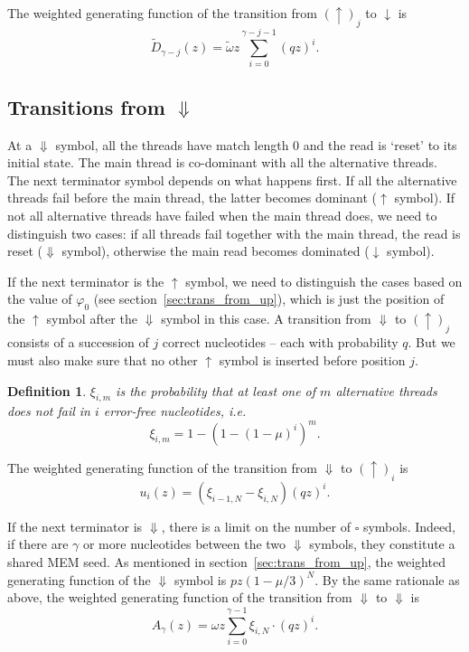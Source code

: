 \documentclass{article}
\newtheorem{definition}{Definition}
\begin{document}
The weighted generating function of the transition from
$(\uparrow)_j$ to $\downarrow$ is
\begin{equation}
\tilde{D}_{\gamma-j}(z) = \tilde{\omega} z
  \sum_{i=0}^{\gamma-j-1} (qz)^i.
\end{equation}


\subsection{Transitions from $\Downarrow$}
\label{sec:trans_from_Down}

At a $\Downarrow$ symbol, all the threads have match length $0$ and the
read is `reset' to its initial state. The main thread is co-dominant with
all the alternative threads. The next terminator symbol depends on what
happens first. If all the alternative threads fail before the main thread,
the latter becomes dominant ($\uparrow$ symbol). If not all alternative
threads have failed when the main thread does, we need to distinguish two
cases: if all threads fail together with the main thread, the read is
reset ($\Downarrow$ symbol), otherwise the main read becomes dominated
($\downarrow$ symbol).

If the next terminator is the $\uparrow$ symbol, we need to distinguish
the cases based on the value of $\varphi_0$ (see
section~\ref{sec:trans_from_up}), which is just the position of the
$\uparrow$ symbol after the $\Downarrow$ symbol in this case. A transition
from $\Downarrow$ to $(\uparrow)_j$ consists of a succession of $j$
correct nucleotides -- each with probability $q$. But we must also make
sure that no other $\uparrow$ symbol is inserted before position $j$.

\begin{definition}
$\xi_{i,m}$ is the probability that at least one of $m$ alternative
threads does not fail in $i$ error-free nucleotides, \textit{i.e.}
\begin{equation}
  \xi_{i,m} = 1-(1-(1-\mu)^i)^m.
\end{equation}
\end{definition}

The weighted generating function of the transition from $\Downarrow$ to
$(\uparrow)_i$ is
\begin{equation}
u_i(z) = (\xi_{i-1,N}-\xi_{i,N})(qz)^i.
\end{equation}


If the next terminator is $\Downarrow$, there is a limit on the
number of $\square$ symbols. Indeed, if there are $\gamma$ or more
nucleotides between the two $\Downarrow$ symbols, they constitute a shared
MEM seed. As mentioned in section~\ref{sec:trans_from_up}, the weighted
generating function of the $\Downarrow$ symbol is $pz(1-\mu/3)^N$. By the
same rationale as above, the weighted generating function of the
transition from $\Downarrow$ to $\Downarrow$ is
\begin{equation}
A_\gamma(z) = \omega z
  \sum_{i=0}^{\gamma-1} \xi_{i,N} \cdot (qz)^i.
\end{equation}
\end{document}
